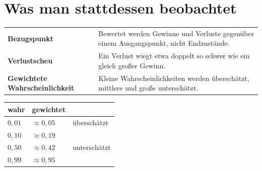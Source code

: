 \section{Was man stattdessen beobachtet}

\begin{merksatz}
\begin{center}
{\small
\renewcommand{\arraystretch}{1.55}
\begin{tabular}{@{}P{2.8cm}P{5.8cm}@{}}
\toprule
\textbf{Bezugspunkt} & Bewertet werden Gewinne und Verluste gegenüber einem Ausgangspunkt, nicht Endzustände.\\
\textbf{Verlustscheu} & Ein Verlust wiegt etwa doppelt so schwer wie ein gleich großer Gewinn.\\
\textbf{Gewichtete Wahrscheinlichkeit} & Kleine Wahrscheinlichkeiten werden überschätzt, mittlere und große unterschätzt.\\
\bottomrule
\end{tabular}}
\end{center}

\begin{center}
{\small
\renewcommand{\arraystretch}{1.48}
\begin{tabular}{@{}P{2.4cm}P{2.6cm}P{2.4cm}@{}}
\toprule
\textbf{wahr} & \textbf{gewichtet} & \\
\midrule
$0{,}01$ & $\approx 0{,}05$ & überschätzt\\
$0{,}10$ & $\approx 0{,}19$ & \\
$0{,}50$ & $\approx 0{,}42$ & unterschätzt\\
$0{,}99$ & $\approx 0{,}95$ & \\
\bottomrule
\end{tabular}}
\end{center}

\begin{center}
\begin{minipage}{0.88\textwidth}
\end{minipage}
\end{center}
\end{merksatz}

